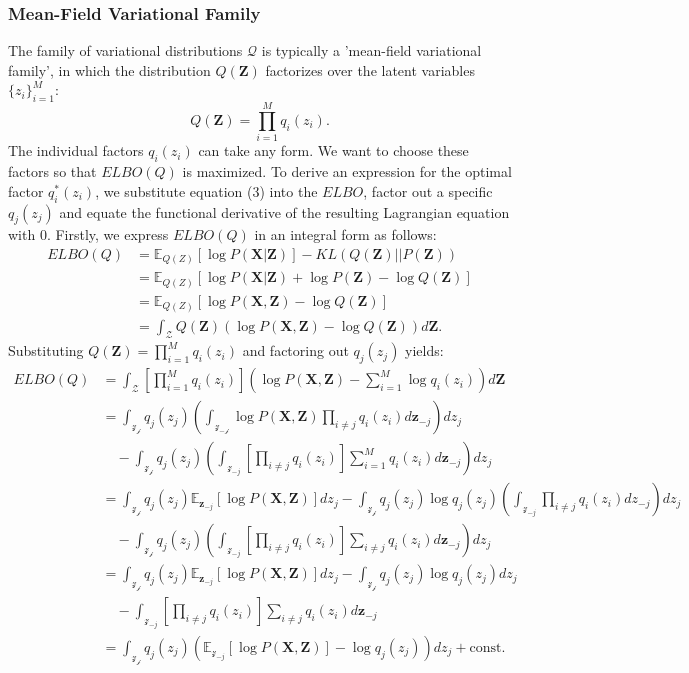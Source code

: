 \documentclass[a4paper,12pt]{article}
\begin{document}
\subsubsection{Mean-Field Variational Family}
The family of variational distributions $\mathcal{Q}$ is typically a 'mean-field variational family', in which the distribution $Q(\textbf{Z})$ factorizes over the latent variables $\{z_i\}^M_{i=1}$:
\begin{equation}
Q(\textbf{Z})=\prod^M_{i=1}q_i(z_i).
\end{equation}
The individual factors $q_i(z_i)$ can take any form. We want to choose these factors so that $ELBO(Q)$ is maximized. To derive an expression for the optimal factor $q_i^*(z_i)$, we substitute equation (3) into the $ELBO$, factor out a specific $q_j(z_j)$ and equate the functional derivative of the resulting Lagrangian equation with 0. Firstly, we express $ELBO(Q)$ in an integral form as follows:
\begin{align*}
ELBO(Q)&= \mathbb{E}_{Q(Z)}[\log P(\textbf{X}|\textbf{Z})]-KL(Q(\textbf{Z})||P(\textbf{Z}))\\
&= \mathbb{E}_{Q(Z)}[\log P(\textbf{X}|\textbf{Z})+\log P(\textbf{Z})-\log Q(\textbf{Z})]\\
&= \mathbb{E}_{Q(Z)}[\log P(\textbf{X}, \textbf{Z})-\log Q(\textbf{Z})]\\
&= \int_{\mathcal{Z}}Q(\textbf{Z})(\log P(\textbf{X},\textbf{Z})-\log Q(\textbf{Z}))d\textbf{Z}.
\end{align*}
Substituting $Q(\textbf{Z})=\prod^M_{i=1}q_i(z_i)$ and factoring out $q_j(z_j)$ yields:
\begin{align}
ELBO(Q)&= \int_\mathcal{Z}\left[\prod^M_{i=1}q_i(z_i)\right]\left(\log P(\textbf{X},\textbf{Z})-\sum_{i=1}^M\log q_i(z_i)\right)d\textbf{Z}\nonumber\\
&= \int_\mathcal{z_j}q_j(z_j)\left(\int_\mathcal{z_{-j}}\log P(\textbf{X},\textbf{Z})\prod_{i\neq j}q_i(z_i)d\textbf{z}_{-j} \right) dz_j\nonumber\\
&\quad -\int_{\mathcal{z_j}}q_j(z_j)\left(\int_{\mathcal{z}_{-j}}\left[\prod_{i\neq j}q_i(z_i)\right]\sum_{i=1}^M q_i(z_i)d\textbf{z}_{-j}\right)dz_j\nonumber\\
&= \int_{\mathcal{z_j}}q_j(z_j)\mathbb{E}_{\textbf{z}_{-j}}[\log P(\textbf{X},\textbf{Z})]dz_j-\int_{\mathcal{z_j}}q_j(z_j)\log q_j(z_j)\left(\int_{\mathcal{z}_{-j}}\prod_{i\neq j}q_i(z_i)dz_{-j}\right) dz_j\nonumber\\
&\quad -\int_{\mathcal{z_j}}q_j(z_j)\left(\int_{\mathcal{z}_{-j}}\left[\prod_{i\neq j}q_i(z_i)\right]\sum_{i\neq j}q_i(z_i)d{\textbf{z}_{-j}}\right)dz_j\nonumber\\
&= \int_\mathcal{z_j}q_j(z_j)\mathbb{E}_{\textbf{z}_{-j}}[\log P(\textbf{X},\textbf{Z})]dz_j-\int_\mathcal{z_j}q_j(z_j)\log q_j(z_j)dz_j\nonumber\\
&\quad -\int_{\mathcal{z}_{-j}}\left[\prod_{i\neq j}q_i(z_i)\right]\sum_{i\neq j}q_i(z_i)d{\textbf{z}_{-j}}
\\&= \int_\mathcal{z_j}q_j(z_j)\left(\mathbb{E}_{\mathcal{z}_{-j}}[\log P(\textbf{X},\textbf{Z})]-\log q_j(z_j)\right)dz_j+\text{const}.
\end{align}
\end{document}
